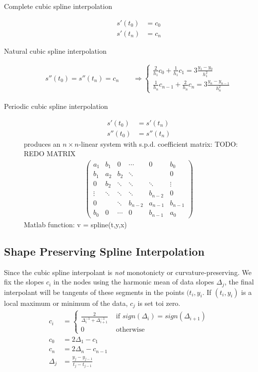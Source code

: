 	\begin{description}
	 \item[Complete cubic spline interpolation]
		\begin{align*}
			s'(t_0) &= c_0\\
			s'(t_n) &= c_n
		\end{align*}
	 \item[Natural cubic spline interpolation] 
		\begin{align*}
		 s''(t_0) = s''(t_n) = c_n \qquad \Rightarrow \left\{
			\begin{array}{l}
			 \frac{2}{h_1}c_0 + \frac{1}{h_1}c_1 = 3\frac{y_1-y_0}{h_1^2}\\
			 \frac{1}{h_n}c_{n-1}+\frac{2}{h_n}c_n = 3\frac{y_n-y_{n-1}}{h_n^2}
			\end{array}\right.
		\end{align*}
	 \item[Periodic cubic spline interpolation]
		\begin{align*}
			s'(t_0) &= s'(t_n)\\
			s''(t_0) &= s''(t_n) 
		\end{align*}
		produces an $n\times n$-linear system with s.p.d. coefficient matrix: TODO: REDO MATRIX %
		\begin{align*}
		 \begin{pmatrix}
		  a_1 & b_1  & 0 	&\cdots&0	 	&b_0 \\
		  b_1 & a_2  & b_2 	&\ddots&   		&0\\
		     0& b_2  &\ddots&\ddots&\ddots  &\vdots\\
		\vdots&\ddots&\ddots&\ddots&b_{n-2}	& 0\\
			 0&		 &\ddots&b_{n-2}&a_{n-1}&b_{n-1}\\
		  b_0 &0	 &\cdots&0     &b_{n-1} &a_0
		 \end{pmatrix}
		\end{align*}
		Matlab function: v = spline(t,y,x)
	\end{description}

	\subsection{Shape Preserving Spline Interpolation}
		Since the cubic spline interpolant is \emph{not} monotonicty or curvature-preserving. We  fix the slopes $c_i$ in the nodes using the harmonic mean of data slopes $\Delta_j$, the final interpolant will be tangents of these segments in the points $(t_i,y_i$. If $(t_i,y_i)$ is a local maximum or minimum of the data, $c_j$ is set toi zero.
		\begin{align*}
		 c_i &= \left\{ \begin{array}{ll}
		                 \frac{2}{\Delta_i^{-1}+\Delta_{i+1}^{-1}} &\text{ if }sign(\Delta_i) = sign(\Delta_{i+1})\\
		                 0 & \text{ otherwise}
		                \end{array}\right.\\
		 c_0 &= 2\Delta_1 - c_1\\
		 c_n &= 2\Delta_n - c_{n-1}\\
		 \Delta_j &= \frac{y_j-y_{j-1}}{t_j-t_{j-1}}
		\end{align*}


